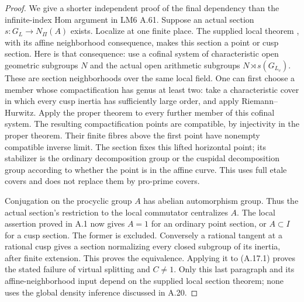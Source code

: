 \begin{proof}
We give a shorter independent proof of the final dependency
than the infinite-index Hom argument in LM6 A.61. Suppose an
actual section $s:G_L\to N_\Pi(A)$ exists. Localize at one
finite place. The supplied local theorem
\cite[Theorem 1.1]{A_OpenAILocal}, with its affine neighborhood
consequence, makes this section a point or cusp section.
Here is that consequence: use a cofinal system of characteristic
open geometric subgroups $N$ and the actual open arithmetic
subgroups $N\rtimes s(G_{L_v})$. These are section neighborhoods
over the same local field. One can first choose a member whose
compactification has genus at least two: take a characteristic
cover in which every cusp inertia has sufficiently large order,
and apply Riemann--Hurwitz. Apply the proper theorem to every
further member of this cofinal system. The
resulting compactification points are compatible, by injectivity
in the proper theorem. Their finite fibres above the first
point have nonempty compatible inverse limit. The section
fixes this lifted horizontal point; its stabilizer is the
ordinary decomposition group or the cuspidal decomposition
group according to whether the point is in the affine curve.
This uses full etale covers and does not replace them by
pro-prime covers.

Conjugation on the procyclic group $A$ has abelian automorphism
group. Thus the actual section's restriction to the local
commutator centralizes $A$. The local assertion proved in A.1
now gives $A=1$ for an ordinary point section, or $A\subset I$
for a cusp section. The former is excluded. Conversely a
rational tangent at a rational cusp gives a section normalizing
every closed subgroup of its inertia, after finite extension.
This proves the equivalence. Applying it to (A.17.1) proves
the stated failure of virtual splitting and $C\ne1$.
Only this last paragraph and its affine-neighborhood input
depend on the supplied local section theorem; none uses the
global density inference discussed in A.20.
\end{proof}

